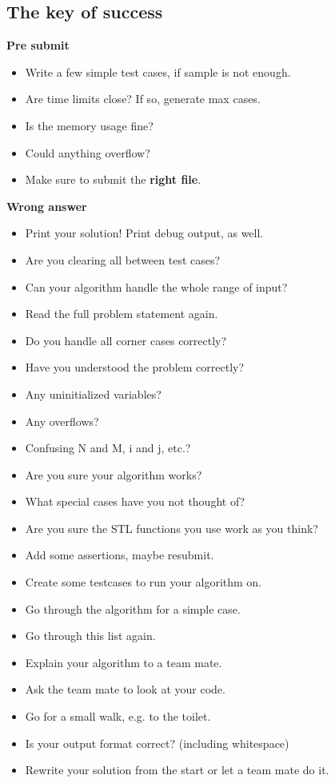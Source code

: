\subsection*{The key of success}
\vspace{-10pt}

\textbf{Pre submit}
\begin{itemize}[noitemsep]
\item Write a few simple test cases, if sample is not enough.
\item Are time limits close? If so, generate max cases.
\item Is the memory usage fine?
\item Could anything overflow?
\item Make sure to submit the \textbf{right file}.
\end{itemize}

\textbf{Wrong answer}
\begin{itemize}[noitemsep]
\item Print your solution! Print debug output, as well.
\item Are you clearing all between test cases?
\item Can your algorithm handle the whole range of input?
\item Read the full problem statement again.
\item Do you handle all corner cases correctly?
\item Have you understood the problem correctly?
\item Any uninitialized variables?
\item Any overflows?
\item Confusing N and M, i and j, etc.?
\item Are you sure your algorithm works?
\item What special cases have you not thought of?
\item Are you sure the STL functions you use work as you think?
\item Add some assertions, maybe resubmit.
\item Create some testcases to run your algorithm on.
\item Go through the algorithm for a simple case.
\item Go through this list again.
\item Explain your algorithm to a team mate.
\item Ask the team mate to look at your code.
\item Go for a small walk, e.g. to the toilet.
\item Is your output format correct? (including whitespace)
\item Rewrite your solution from the start or let a team mate do it.
\end{itemize}

